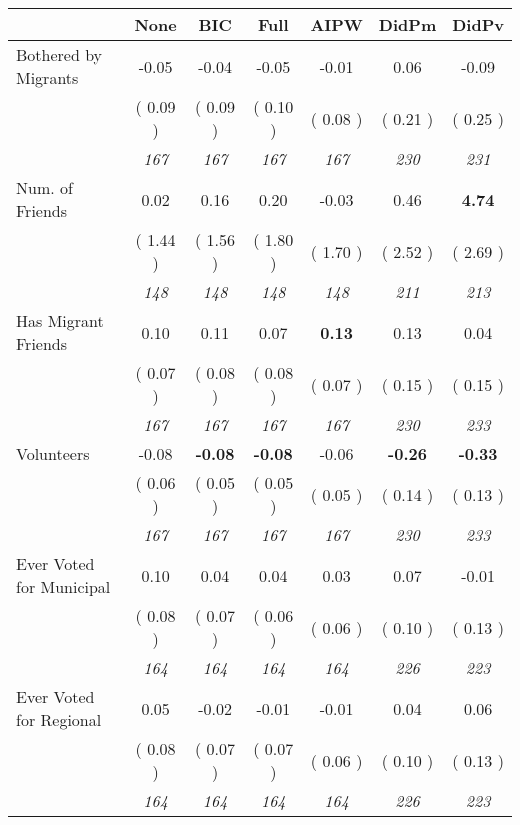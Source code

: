 \begin{tabular}{l c c c c c c}
\toprule
 & None & BIC & Full & AIPW & DidPm & DidPv \\
\midrule
Bothered by Migrants &     -0.05 &     -0.04 &     -0.05 &     -0.01 &      0.06 &     -0.09 \\
& (     0.09 ) & (     0.09 ) & (     0.10 ) & (     0.08 ) & (     0.21 ) & (     0.25 ) \\
& \textit{ 167 } & \textit{ 167 } & \textit{ 167 } & \textit{ 167 } & \textit{ 230 } & \textit{ 231 } \\
Num. of Friends &      0.02 &      0.16 &      0.20 &     -0.03 &      0.46 & \textbf{      4.74 } \\
& (     1.44 ) & (     1.56 ) & (     1.80 ) & (     1.70 ) & (     2.52 ) & (     2.69 ) \\
& \textit{ 148 } & \textit{ 148 } & \textit{ 148 } & \textit{ 148 } & \textit{ 211 } & \textit{ 213 } \\
Has Migrant Friends &      0.10 &      0.11 &      0.07 & \textbf{     0.13} &      0.13 &      0.04 \\
& (     0.07 ) & (     0.08 ) & (     0.08 ) & (     0.07 ) & (     0.15 ) & (     0.15 ) \\
& \textit{ 167 } & \textit{ 167 } & \textit{ 167 } & \textit{ 167 } & \textit{ 230 } & \textit{ 233 } \\
Volunteers &     -0.08 & \textbf{     -0.08 } & \textbf{     -0.08 } &     -0.06 & \textbf{     -0.26 } & \textbf{     -0.33 } \\
& (     0.06 ) & (     0.05 ) & (     0.05 ) & (     0.05 ) & (     0.14 ) & (     0.13 ) \\
& \textit{ 167 } & \textit{ 167 } & \textit{ 167 } & \textit{ 167 } & \textit{ 230 } & \textit{ 233 } \\
Ever Voted for Municipal &      0.10 &      0.04 &      0.04 &      0.03 &      0.07 &     -0.01 \\
& (     0.08 ) & (     0.07 ) & (     0.06 ) & (     0.06 ) & (     0.10 ) & (     0.13 ) \\
& \textit{ 164 } & \textit{ 164 } & \textit{ 164 } & \textit{ 164 } & \textit{ 226 } & \textit{ 223 } \\
Ever Voted for Regional &      0.05 &     -0.02 &     -0.01 &     -0.01 &      0.04 &      0.06 \\
& (     0.08 ) & (     0.07 ) & (     0.07 ) & (     0.06 ) & (     0.10 ) & (     0.13 ) \\
& \textit{ 164 } & \textit{ 164 } & \textit{ 164 } & \textit{ 164 } & \textit{ 226 } & \textit{ 223 } \\
\bottomrule
\end{tabular}
